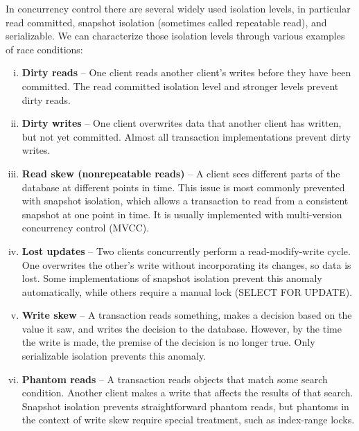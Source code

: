 \documentclass{article}
\begin{document}
    In concurrency control there are several widely used isolation levels, in particular read committed, snapshot isolation (sometimes called repeatable read), and serializable. We can characterize those isolation levels through various examples of race conditions:
    
    \begin{enumerate}[i.]
        \item \textbf{Dirty reads} -- One client reads another client’s writes before they have been committed. The read committed isolation level and stronger levels prevent dirty reads.
        
        \item \textbf{Dirty writes} -- One client overwrites data that another client has written, but not yet committed. Almost all transaction implementations prevent dirty writes.
        
        \item \textbf{Read skew (nonrepeatable reads)} -- A client sees different parts of the database at different points in time. This issue is most commonly prevented with snapshot isolation, which allows a transaction   to read from a consistent snapshot at one point in time. It is usually implemented with multi-version concurrency control (MVCC).
        
        \item \textbf{Lost updates} -- Two clients concurrently perform a read-modify-write cycle. One overwrites the other’s write without incorporating its changes, so data is lost. Some implementations of snapshot isolation prevent this anomaly automatically, while others require a manual lock (SELECT FOR UPDATE).
        
        \item \textbf{Write skew} -- A transaction reads something, makes a decision based on the value it saw, and writes the decision to the database. However, by the time the write is made, the premise of the decision is no longer true. Only serializable isolation prevents this  anomaly.
        
        \item \textbf{Phantom reads} -- A transaction reads objects that match some search condition. Another client makes a write that affects the results of that search. Snapshot isolation prevents straightforward phantom reads, but phantoms in the context of write skew require special treatment, such as index-range locks.
    \end{enumerate}
    
\end{document}
